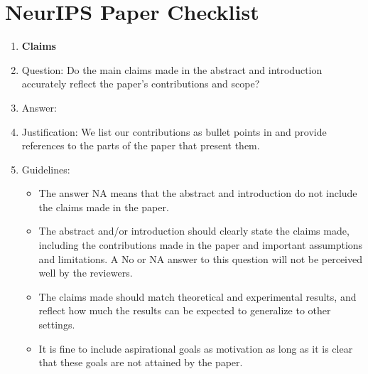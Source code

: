 \newpage

\section*{NeurIPS Paper Checklist}

\begin{enumerate}
\item {\bf Claims}
\item[] Question: Do the main claims made in the abstract and introduction accurately reflect the paper's contributions and scope?
\item[] Answer: \answerYes{}
\item[] Justification: We list our contributions as bullet points in  and provide references to the parts of the paper that present them.
\item[] Guidelines:
  \begin{itemize}
  \item The answer NA means that the abstract and introduction do not include the claims made in the paper.
  \item The abstract and/or introduction should clearly state the claims made, including the contributions made in the paper and important assumptions and limitations. A No or NA answer to this question will not be perceived well by the reviewers.
  \item The claims made should match theoretical and experimental results, and reflect how much the results can be expected to generalize to other settings.
  \item It is fine to include aspirational goals as motivation as long as it is clear that these goals are not attained by the paper.
  \end{itemize}


\end{enumerate}
